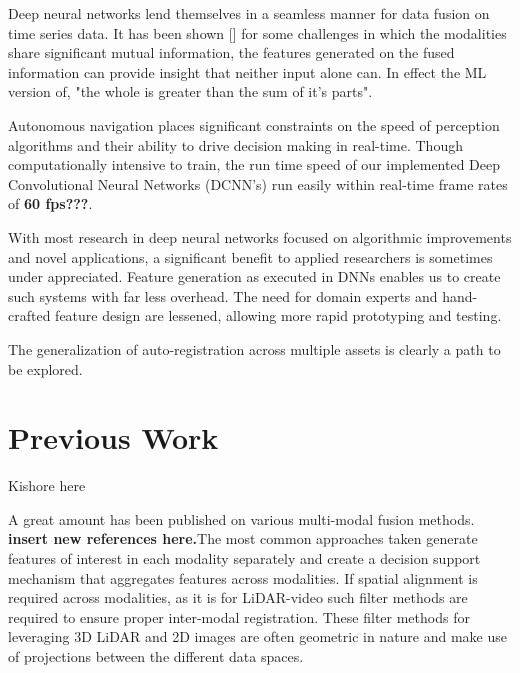 \documentclass{article}
\begin{document}
Deep neural networks lend themselves in a seamless manner for data fusion on time series data. It has been shown [\cite{Ngiam2011Multimodal}] for some challenges in which the modalities share significant mutual information, the features generated on the fused information can provide insight that neither input alone can. In effect the ML version of, "the whole is greater than the sum of it's parts". 

Autonomous navigation places significant constraints on the speed of perception algorithms and their ability to drive decision making in real-time. Though computationally intensive to train, the run time speed of our implemented Deep Convolutional Neural Networks (DCNN's) run easily within real-time frame rates of \textbf{60 fps???}. 

With most research in deep neural networks focused on algorithmic improvements and novel applications, a significant benefit to applied researchers is sometimes under appreciated. Feature generation
as executed in DNNs enables us to create such systems with far less overhead. The need for domain experts and hand-crafted feature design are lessened, allowing more rapid prototyping and testing. 

The generalization of auto-registration across multiple assets is clearly a path to be explored. 


\section{Previous Work} %
\label{sec:previous_work}
Kishore here

A great amount has been published on various multi-modal fusion methods.\textbf{ insert new references here.}The most common approaches taken generate features of interest in each modality separately and create a decision support mechanism that aggregates features across modalities. If spatial alignment is required across modalities, as it is for LiDAR-video such filter methods \cite{Thrun2011Googles-dr} are required to ensure proper inter-modal registration. These filter methods for leveraging 3D LiDAR and 2D images are often geometric in nature and make use of projections between the different data spaces. 
\end{document}
